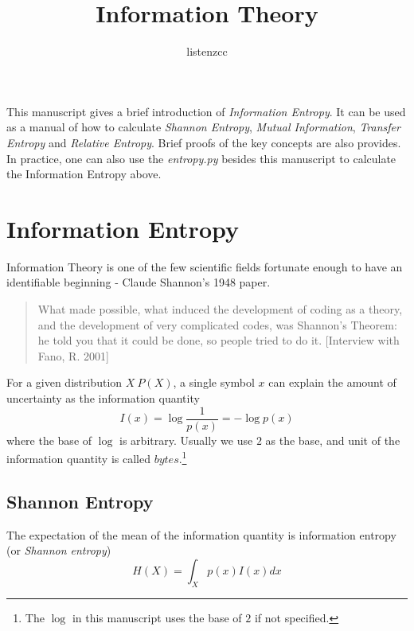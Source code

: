 \documentclass[a4paper]{article}
\title{Information Theory}
\author{listenzcc}
\begin{document}
\maketitle


\abstract
This manuscript gives a brief introduction of \emph{Information Entropy}.
It can be used as a manual of how to calculate \emph{Shannon Entropy}, \emph{Mutual Information}, \emph{Transfer Entropy} and \emph{Relative Entropy}.
Brief proofs of the key concepts are also provides.
In practice, one can also use the \emph{entropy.py} besides this manuscript to calculate the Information Entropy above.

\tableofcontents

\section{Information Entropy}
Information Theory is one of the few scientific fields fortunate enough to have an identifiable beginning - Claude Shannon's 1948 paper.
\begin{quote}
    What made possible, what induced the development of coding as a theory, and
    the development of very complicated codes, was Shannon's Theorem: he told
    you that it could be done, so people tried to do it.
        [Interview with Fano, R. 2001]
\end{quote}

For a given distribution $X ~ P(X)$, a single symbol $x$ can explain the amount of uncertainty as the information quantity
\begin{equation}
    I(x) = \log{\frac{1}{p(x)}} = - \log{p(x)}
    \label{eq: Information Quantity x}
\end{equation}
where the base of $\log{}$ is arbitrary. Usually we use $2$ as the base, and unit of the information quantity is called $bytes$.\footnote{The $\log{}$ in this manuscript uses the base of $2$ if not specified.}

\subsection{Shannon Entropy}
The expectation of the mean of the information quantity is information entropy (or \emph{Shannon entropy})
\begin{equation}
    H(X) = \int_{X} p(x) I(x) dx
    \label{eq: X}
\end{equation}
\end{document}
